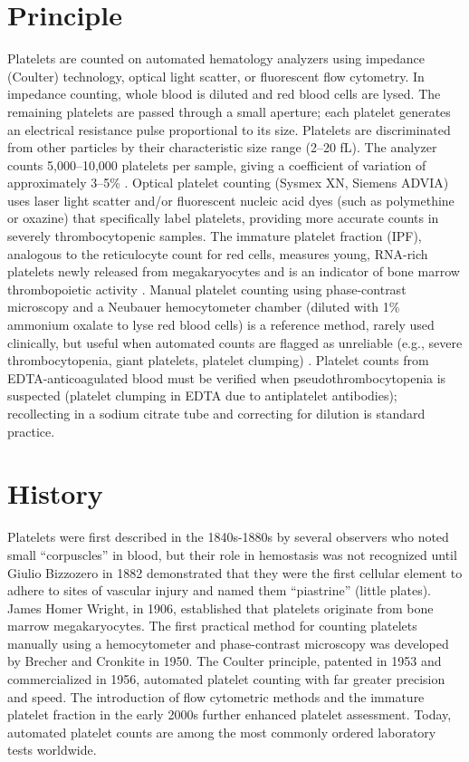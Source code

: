 \section*{Principle}
Platelets are counted on automated hematology analyzers using impedance (Coulter) technology, optical light scatter, or fluorescent flow cytometry. In impedance counting, whole blood is diluted and red blood cells are lysed. The remaining platelets are passed through a small aperture; each platelet generates an electrical resistance pulse proportional to its size. Platelets are discriminated from other particles by their characteristic size range (2--20 fL). The analyzer counts 5,000--10,000 platelets per sample, giving a coefficient of variation of approximately 3--5\% \cite{tietz2012textbook}. Optical platelet counting (Sysmex XN, Siemens ADVIA) uses laser light scatter and/or fluorescent nucleic acid dyes (such as polymethine or oxazine) that specifically label platelets, providing more accurate counts in severely thrombocytopenic samples. The immature platelet fraction (IPF), analogous to the reticulocyte count for red cells, measures young, RNA-rich platelets newly released from megakaryocytes and is an indicator of bone marrow thrombopoietic activity \cite{kaushansky2021williams}. Manual platelet counting using phase-contrast microscopy and a Neubauer hemocytometer chamber (diluted with 1\% ammonium oxalate to lyse red blood cells) is a reference method, rarely used clinically, but useful when automated counts are flagged as unreliable (e.g., severe thrombocytopenia, giant platelets, platelet clumping) \cite{bain2017dacie}. Platelet counts from EDTA-anticoagulated blood must be verified when pseudothrombocytopenia is suspected (platelet clumping in EDTA due to antiplatelet antibodies); recollecting in a sodium citrate tube and correcting for dilution is standard practice.

\section*{History}
Platelets were first described in the 1840s-1880s by several observers who noted small ``corpuscles'' in blood, but their role in hemostasis was not recognized until Giulio Bizzozero in 1882 demonstrated that they were the first cellular element to adhere to sites of vascular injury and named them ``piastrine'' (little plates). James Homer Wright, in 1906, established that platelets originate from bone marrow megakaryocytes. The first practical method for counting platelets manually using a hemocytometer and phase-contrast microscopy was developed by Brecher and Cronkite in 1950. The Coulter principle, patented in 1953 and commercialized in 1956, automated platelet counting with far greater precision and speed. The introduction of flow cytometric methods and the immature platelet fraction in the early 2000s further enhanced platelet assessment. Today, automated platelet counts are among the most commonly ordered laboratory tests worldwide.

